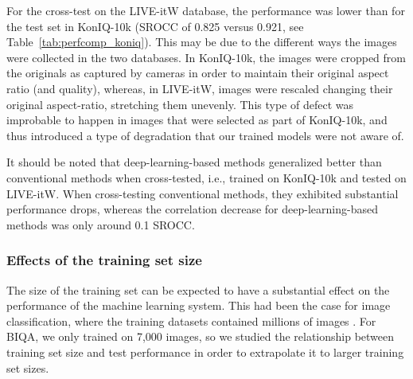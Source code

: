 \documentclass[10pt,journal,compsoc]{IEEEtran}
\begin{document}
For the cross-test on the LIVE-itW database, the performance was lower than for the test set in KonIQ-10k (SROCC of 0.825 versus 0.921, see Table~\ref{tab:perfcomp_koniq}). This may be due to the different ways the images were collected in the two databases. In KonIQ-10k, the images were cropped from the originals as captured by cameras in order to maintain their original aspect ratio (and quality), whereas, in LIVE-itW, images were rescaled changing their original aspect-ratio, stretching them unevenly. This type of defect was improbable to happen in images that were selected as part of KonIQ-10k, and thus introduced a type of degradation that our trained models were not aware of.

It should be noted that deep-learning-based methods generalized better than conventional methods when cross-tested, i.e., trained on KonIQ-10k and tested on LIVE-itW. When cross-testing conventional methods, they exhibited substantial performance drops, whereas the correlation decrease for deep-learning-based methods was only around 0.1 SROCC.



















\subsubsection{Effects of the training set size}
The size of the training set can be expected to have a substantial effect on the performance of the machine learning system. This had been the case for image classification, where the training datasets contained millions of images \cite{deng2009imagenet}. For BIQA, we only trained on 7,000 images, so we studied the relationship between training set size and test performance in order to extrapolate it to larger training set sizes.
\end{document}
